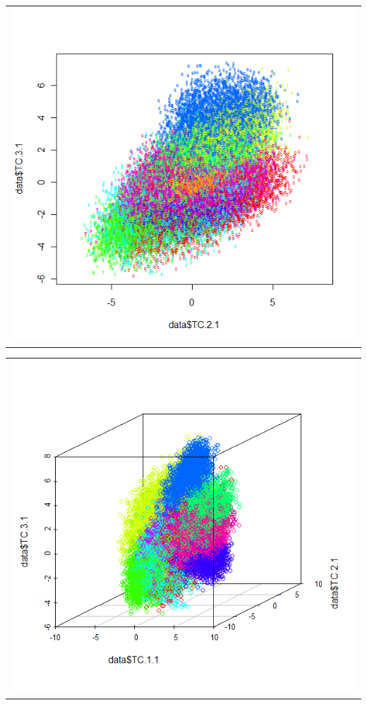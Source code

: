 \newpage

\begin{table}[h!]
\begin{subtable}{.5\linewidth}
\begin{tabular}{c}
	\includegraphics[scale=0.4]{exp5/AllVsAll/PLS-23}
\end{tabular}
\end{subtable}
\begin{subtable}{.5\linewidth}
\begin{tabular}{c}
	\includegraphics[scale=0.4]{exp5/AllVsAll/PLS-123}
\end{tabular}
\end{subtable}
\end{table}
